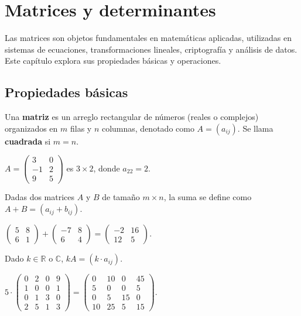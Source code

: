 \chapter{Matrices y determinantes}\label{matrdet}
Las matrices son objetos fundamentales en matemáticas aplicadas, utilizadas en sistemas de ecuaciones, transformaciones lineales, criptografía y análisis de datos. Este capítulo explora sus propiedades básicas y operaciones.

\section{Propiedades básicas}

\begin{definition}[Matriz] Una \textbf{matriz} es un arreglo rectangular de números (reales o complejos) organizados en $m$ filas y $n$ columnas, denotado como $A = (a_{ij})$. Se llama \textbf{cuadrada} si $m = n$.
\end{definition}

\begin{example} $A = \begin{pmatrix} 3 & 0 \\ -1 & 2 \\ 9 & 5 \end{pmatrix}$ es $3 \times 2$, donde $a_{22} = 2$.
\end{example}

\begin{definition} Dadas dos matrices $A$ y $B$ de tamaño $m \times n$, la suma se define como $A + B = (a_{ij} + b_{ij})$.
\end{definition}

\begin{example} $\begin{pmatrix} 5 & 8 \\ 6 & 1 \end{pmatrix} + \begin{pmatrix} -7 & 8 \\ 6 & 4 \end{pmatrix} = \begin{pmatrix} -2 & 16 \\ 12 & 5 \end{pmatrix}.$
\end{example}

\begin{definition}
Dado $k \in \mathbb{R}$ o $\mathbb{C}$, $kA = (k \cdot a_{ij})$.
\end{definition}
\begin{example} $5 \cdot \begin{pmatrix} 0 & 2 & 0 & 9 \\ 1 & 0 & 0 & 1 \\ 0 & 1 & 3 & 0 \\ 2 & 5 & 1 & 3 \end{pmatrix} = \begin{pmatrix} 0 & 10 & 0 & 45 \\ 5 & 0 & 0 & 5 \\ 0 & 5 & 15 & 0 \\ 10 & 25 & 5 & 15 \end{pmatrix}.$
\end{example}

